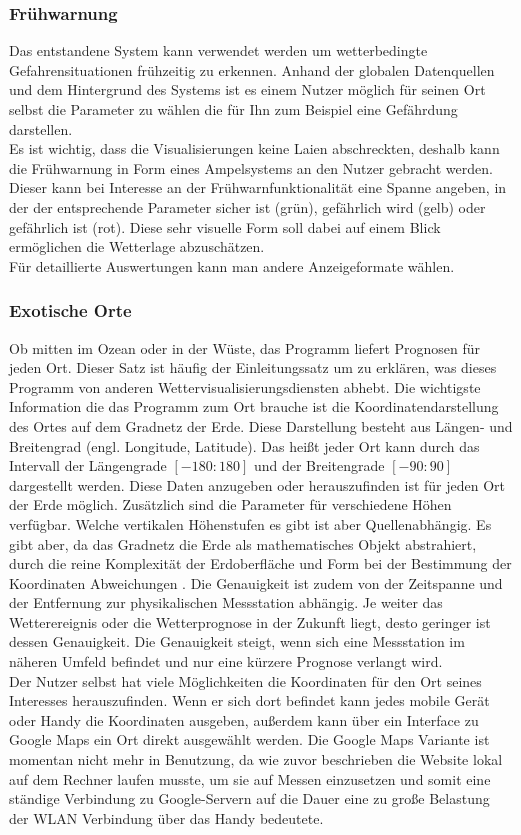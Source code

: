 \subsubsection{Frühwarnung} %
Das entstandene System kann verwendet werden um
wetterbedingte Gefahrensituationen frühzeitig zu erkennen.
Anhand der globalen Datenquellen und dem Hintergrund des
Systems ist es einem Nutzer möglich für seinen Ort selbst die
Parameter zu wählen die für Ihn zum Beispiel eine Gefährdung darstellen.\\
Es ist wichtig, dass die Visualisierungen keine Laien abschreckten,
deshalb kann die Frühwarnung in Form eines
Ampelsystems an den Nutzer gebracht werden.
Dieser kann bei Interesse an der Frühwarnfunktionalität eine Spanne angeben,
in der der entsprechende Parameter sicher ist (grün),
gefährlich wird (gelb) oder gefährlich ist (rot).
Diese sehr visuelle Form soll dabei auf einem Blick ermöglichen die Wetterlage abzuschätzen.\\
Für detaillierte Auswertungen kann man andere Anzeigeformate wählen.

\subsubsection{Exotische Orte} %
Ob mitten im Ozean oder in der Wüste, das Programm liefert Prognosen für jeden Ort.
Dieser Satz ist häufig der Einleitungssatz um zu erklären, was dieses Programm
von anderen Wettervisualisierungsdiensten abhebt.
Die wichtigste Information die das Programm zum Ort brauche ist die Koordinatendarstellung des
Ortes auf dem Gradnetz der Erde.
Diese Darstellung besteht aus Längen- und Breitengrad (engl. Longitude, Latitude).
Das heißt jeder Ort kann durch das Intervall der Längengrade $[-180:180]$ und
der Breitengrade $[-90:90]$ dargestellt werden.
Diese Daten anzugeben oder herauszufinden ist für jeden Ort der Erde möglich.
Zusätzlich sind die Parameter für verschiedene Höhen verfügbar.
Welche vertikalen Höhenstufen es gibt ist aber Quellenabhängig.
Es gibt aber, da das Gradnetz die Erde als mathematisches Objekt abstrahiert,
durch die reine Komplexität der Erdoberfläche und Form bei der Bestimmung der
Koordinaten Abweichungen \cite{tomgeo}.
Die Genauigkeit ist zudem von der Zeitspanne und
der Entfernung zur physikalischen Messstation abhängig.
Je weiter das Wetterereignis oder die Wetterprognose in der Zukunft liegt,
desto geringer ist dessen Genauigkeit.
Die Genauigkeit steigt, wenn sich eine Messstation im näheren Umfeld befindet und
nur eine kürzere Prognose verlangt wird.\\
Der Nutzer selbst hat viele Möglichkeiten die Koordinaten
für den Ort seines Interesses herauszufinden.
Wenn er sich dort befindet kann jedes mobile Gerät oder
Handy die Koordinaten ausgeben, außerdem kann
über ein Interface zu Google Maps ein Ort direkt ausgewählt werden.
Die Google Maps Variante ist momentan nicht mehr in Benutzung,
da wie zuvor beschrieben
die Website lokal auf dem Rechner laufen musste, um sie auf Messen einzusetzen
und somit eine ständige Verbindung zu Google-Servern auf die Dauer eine zu
große Belastung der WLAN Verbindung über das Handy bedeutete.

